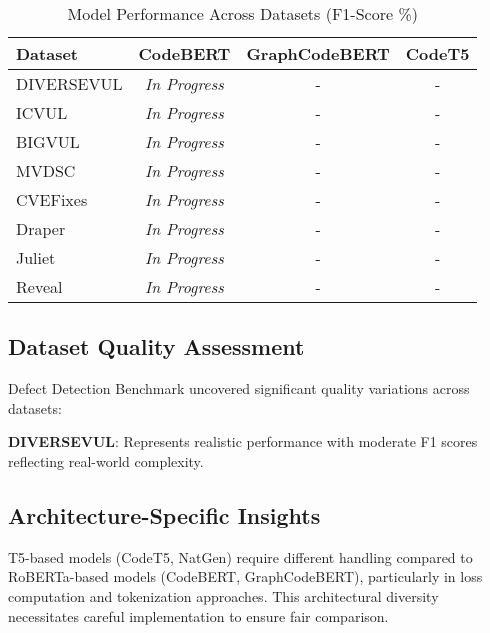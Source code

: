 \documentclass[letterpaper]{article}
\begin{document}
\begin{table}[ht]
	\centering
	\caption{Model Performance Across Datasets (F1-Score \%)}
	\label{tab:results}
	\begin{tabular}{lccc}
		\toprule
		Dataset    & CodeBERT             & GraphCodeBERT & CodeT5 \\%
		\midrule
		DIVERSEVUL & \textit{In Progress} & -             & -      \\%
		ICVUL      & \textit{In Progress} & -             & -      \\%
		BIGVUL     & \textit{In Progress} & -             & -      \\%
		MVDSC      & \textit{In Progress} & -             & -      \\%
		CVEFixes   & \textit{In Progress} & -             & -      \\%
		Draper     & \textit{In Progress} & -             & -      \\%
		Juliet     & \textit{In Progress} & -             & -      \\%
		Reveal     & \textit{In Progress} & -             & -      \\%
		\bottomrule
	\end{tabular}
\end{table}

\subsection{Dataset Quality Assessment}
Defect Detection Benchmark uncovered significant quality variations across datasets:

\textbf{DIVERSEVUL}: Represents realistic performance with moderate F1 scores reflecting real-world complexity.

\subsection{Architecture-Specific Insights}
T5-based models (CodeT5, NatGen) require different handling compared to RoBERTa-based models (CodeBERT, GraphCodeBERT), particularly in loss computation and tokenization approaches. This architectural diversity necessitates careful implementation to ensure fair comparison.
\end{document}
